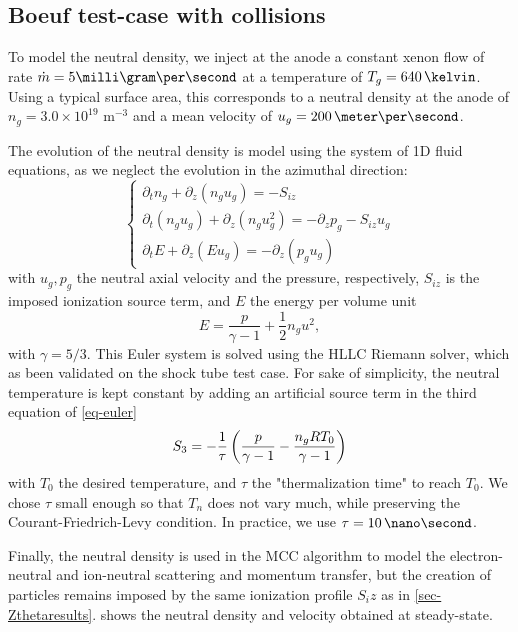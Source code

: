  \subsection{Boeuf test-case with collisions} \label{subsec-MCC_boeuf}

  To model the neutral density, we inject at the anode a constant xenon flow of rate $\dot{m} = 5 \milli\gram\per\second$ at a temperature of $T_g = 640\,\kelvin$.
  Using a typical surface area, this corresponds to a neutral density at the anode of $n_g=3.0 \times 10^{19}$ {m}$^{-3}$ and a mean velocity of $u_g = 200 \,\meter\per\second$.
  
  The evolution of the neutral density is model using the system of \ac{1D} fluid equations, as we neglect the evolution in the azimuthal direction\string:
  \begin{equation}
  \left\{
  \begin{gathered}
  \partial_{t} n_g + \partial_{z}(n_g u_g) = - S_{iz}\\
  \partial_{t}(n_g u_g) + \partial_{z}(n_g u_g^{2}) = -\partial_{z}p_g - S_{iz} u_g \\
  \partial_{t}E + \partial_{z}(Eu_g) = - \partial_{z}(p_g u_g)
  \end{gathered}
  \right.
  \label{eq-euler}
  \end{equation}
  with $u_g, p_g$ the neutral axial velocity and the pressure, respectively, $S_{iz}$ is the imposed ionization source term, and $E$ the energy per volume unit
  \begin{equation}
    E =  \frac{p}{\gamma - 1} + \frac{1}{2} n_g u^{2},
  \end{equation}
  with $\gamma=5/3$.
  This Euler system is solved using the HLLC Riemann solver, which as been validated on the  shock tube test case.
  For sake of simplicity, the neutral temperature is kept constant by adding an artificial source term in the third equation of \cref{eq-euler}
  \begin{equation} \label{eq-artificial}
    S_3 = -\frac{1}{\tau} \left(  \frac{p}{\gamma - 1} - \frac{n_g R T_0}{\gamma-1} \right)
  \end{equation}
  with $T_0$ the desired temperature, and $\tau$ the "thermalization time" to reach $T_0$.
  We chose $\tau$ small enough so that $T_n$ does not vary much, while preserving the Courant-Friedrich-Levy condition.
  In practice, we use $\tau = 10\,\nano\second$.
  
  Finally, the neutral density is used in the \ac{MCC} algorithm to model the electron-neutral and ion-neutral scattering and momentum transfer, but the creation of particles remains imposed by the same ionization profile $S_iz$ as in \cref{sec-Zthetaresults}.
   shows the neutral density and velocity obtained at steady-state.

